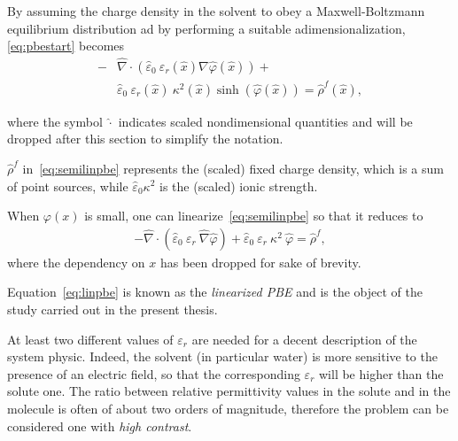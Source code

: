 \documentclass[11pt,a4paper,twocolumn]{article}
\begin{document}
By assuming the charge density in the solvent to obey a 
Maxwell-Boltzmann equilibrium distribution ad by performing
a suitable adimensionalization, \eqref{eq:pbestart}
becomes
\begin{equation}
    \begin{split}
       - &\hat{\nabla} \cdot \left(  
       \hat{\varepsilon}_0\ \varepsilon_r(\hat{x}) \nabla \hat{\varphi}(\hat{x}) 
       \right) + \\ &  \hat{\varepsilon}_0\ \varepsilon_r(\hat{x})\
       \kappa^2(\hat{x}) 
       \sinh\left(\hat{\varphi}(\hat{x})\right)  = 
        \hat{\rho}^f (\hat{x}) ,
        \label{eq:semilinpbe}
    \end{split}
\end{equation}

where the symbol $\hat{\cdot}$ indicates scaled 
nondimensional quantities and will be dropped after this 
section to simplify the notation.



 $\hat{\rho}^f$ in~\eqref{eq:semilinpbe} represents the 
 (scaled) fixed charge density, which is a sum of point 
 sources, while $\hat{\varepsilon}_0 \kappa^2$ is 
 the (scaled) ionic strength.
 


When $\varphi (x)$ is small, one can 
linearize~\eqref{eq:semilinpbe} so that it 
reduces to 
\begin{equation}
    \begin{split}
        -\hat{\nabla} \cdot \left(
        \hat{\varepsilon}_0\ \varepsilon_r\  \hat{\nabla} \hat{\varphi} 
        \right) +  \hat{\varepsilon}_0\ \varepsilon_r\ \kappa^2\ 
        \hat{\varphi}
        = \hat{\rho}^f,
        \label{eq:linpbe}
    \end{split}
\end{equation}
where the dependency on $x$ has been dropped for sake of 
brevity.

Equation~\eqref{eq:linpbe} is known as the \emph{linearized 
PBE} and is the object of the study carried out in the 
present thesis.

At least two different values of $\varepsilon_r$ are needed 
for a decent description of the system physic. 
Indeed, the solvent (in particular water) 
is more sensitive to the presence of an electric field, so 
that the corresponding $\varepsilon_r$ will be higher than 
the solute one. 
The ratio between relative permittivity values in the solute and in the molecule is often of about two orders of 
magnitude, therefore the problem can be considered 
one with \emph{high contrast}.
\end{document}
